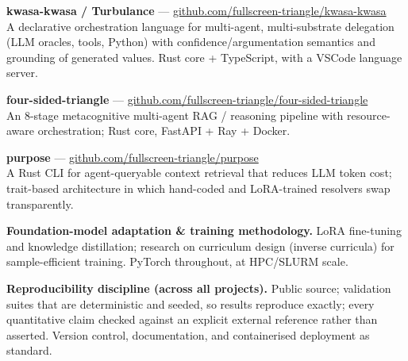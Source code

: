 \documentclass[11pt,a4paper]{article}
\begin{document}
\textbf{kwasa-kwasa / Turbulance} --- \href{https://github.com/fullscreen-triangle/kwasa-kwasa}{github.com/fullscreen-triangle/kwasa-kwasa}\\
A declarative orchestration language for multi-agent, multi-substrate delegation
(LLM oracles, tools, Python) with confidence/argumentation semantics and grounding
of generated values. Rust core + TypeScript, with a VSCode language server.

\textbf{four-sided-triangle} --- \href{https://github.com/fullscreen-triangle/four-sided-triangle}{github.com/fullscreen-triangle/four-sided-triangle}\\
An 8-stage metacognitive multi-agent RAG / reasoning pipeline with resource-aware
orchestration; Rust core, FastAPI + Ray + Docker.

\textbf{purpose} --- \href{https://github.com/fullscreen-triangle/purpose}{github.com/fullscreen-triangle/purpose}\\
A Rust CLI for agent-queryable context retrieval that reduces LLM token cost;
trait-based architecture in which hand-coded and LoRA-trained resolvers swap
transparently.

\vspace{6pt}
\textbf{Foundation-model adaptation \& training methodology.} LoRA fine-tuning and
knowledge distillation; research on curriculum design (inverse curricula) for
sample-efficient training. PyTorch throughout, at HPC/SLURM scale.

\vspace{6pt}
\textbf{Reproducibility discipline (across all projects).} Public source; validation
suites that are deterministic and seeded, so results reproduce exactly; every
quantitative claim checked against an explicit external reference rather than
asserted. Version control, documentation, and containerised deployment as standard.
\end{document}
